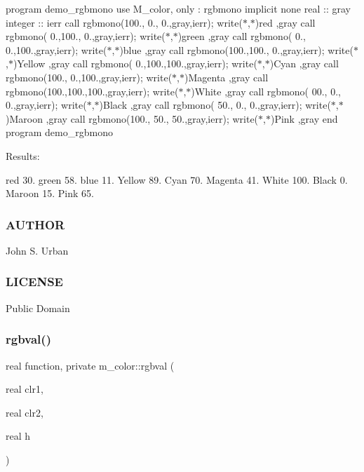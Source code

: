 program demo\+\_\+rgbmono use M\+\_\+color, only \+: rgbmono implicit none real \+:\+: gray integer \+:\+: ierr call rgbmono(100., 0., 0.,gray,ierr); write($\ast$,$\ast$)\textquotesingle{}red \textquotesingle{},gray call rgbmono( 0.,100., 0.,gray,ierr); write($\ast$,$\ast$)\textquotesingle{}green \textquotesingle{},gray call rgbmono( 0., 0.,100.,gray,ierr); write($\ast$,$\ast$)\textquotesingle{}blue \textquotesingle{},gray call rgbmono(100.,100., 0.,gray,ierr); write($\ast$,$\ast$)\textquotesingle{}Yellow \textquotesingle{},gray call rgbmono( 0.,100.,100.,gray,ierr); write($\ast$,$\ast$)\textquotesingle{}Cyan \textquotesingle{},gray call rgbmono(100., 0.,100.,gray,ierr); write($\ast$,$\ast$)\textquotesingle{}Magenta \textquotesingle{},gray call rgbmono(100.,100.,100.,gray,ierr); write($\ast$,$\ast$)\textquotesingle{}White \textquotesingle{},gray call rgbmono( 00., 0., 0.,gray,ierr); write($\ast$,$\ast$)\textquotesingle{}Black \textquotesingle{},gray call rgbmono( 50., 0., 0.,gray,ierr); write($\ast$,$\ast$)\textquotesingle{}Maroon \textquotesingle{},gray call rgbmono(100., 50., 50.,gray,ierr); write($\ast$,$\ast$)\textquotesingle{}Pink \textquotesingle{},gray end program demo\+\_\+rgbmono

Results\+:

red 30. green 58. blue 11. Yellow 89. Cyan 70. Magenta 41. White 100. Black 0. Maroon 15. Pink 65.

\subsubsection*{A\+U\+T\+H\+OR}

John S. Urban

\subsubsection*{L\+I\+C\+E\+N\+SE}

Public Domain \mbox{\label{namespacem__color_a3e97e24dba7b820f685f13eaa64a6caa}} 
\subsubsection{\texorpdfstring{rgbval()}{rgbval()}}
{\footnotesize\ttfamily real function, private m\+\_\+color\+::rgbval (\begin{DoxyParamCaption}\item[{real}]{clr1,  }\item[{real}]{clr2,  }\item[{real}]{h }\end{DoxyParamCaption})\hspace{0.3cm}{\ttfamily [private]}}


